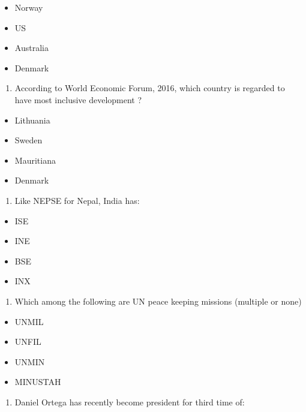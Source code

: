 \documentclass[
]{book}
\providecommand{\tightlist}{%
  \setlength{\itemsep}{0pt}\setlength{\parskip}{0pt}}
\begin{document}
\begin{itemize}
\tightlist
\item
  Norway
\item
  US
\item
  Australia
\item
  Denmark
\end{itemize}

\begin{enumerate}
\def\labelenumi{\arabic{enumi}.}
\setcounter{enumi}{3}
\tightlist
\item
  According to World Economic Forum, 2016, which country is regarded to have most inclusive development ?
\end{enumerate}

\begin{itemize}
\tightlist
\item
  Lithuania
\item
  Sweden
\item
  Mauritiana
\item
  Denmark
\end{itemize}

\begin{enumerate}
\def\labelenumi{\arabic{enumi}.}
\setcounter{enumi}{4}
\tightlist
\item
  Like NEPSE for Nepal, India has:
\end{enumerate}

\begin{itemize}
\tightlist
\item
  ISE
\item
  INE
\item
  BSE
\item
  INX
\end{itemize}

\begin{enumerate}
\def\labelenumi{\arabic{enumi}.}
\setcounter{enumi}{5}
\tightlist
\item
  Which among the following are UN peace keeping missions (multiple or none)
\end{enumerate}

\begin{itemize}
\tightlist
\item
  UNMIL
\item
  UNFIL
\item
  UNMIN
\item
  MINUSTAH
\end{itemize}

\begin{enumerate}
\def\labelenumi{\arabic{enumi}.}
\setcounter{enumi}{6}
\tightlist
\item
  Daniel Ortega has recently become president for third time of:
\end{enumerate}
\end{document}
